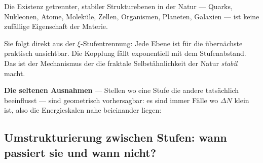 \begin{foundation}
Die Existenz getrennter, stabiler Strukturebenen
in der Natur --- Quarks, Nukleonen, Atome,
Moleküle, Zellen, Organismen, Planeten, Galaxien ---
ist keine zufällige Eigenschaft der Materie.

Sie folgt direkt aus der $\xi$-Stufentrennung:
Jede Ebene ist für die übernächste praktisch unsichtbar.
Die Kopplung fällt exponentiell mit dem Stufenabstand.
Das ist der Mechanismus der die fraktale
Selbstähnlichkeit der Natur \emph{stabil} macht.

\textbf{Die seltenen Ausnahmen} --- Stellen wo eine Stufe
die andere tatsächlich beeinflusst ---
sind geometrisch vorhersagbar:
es sind immer Fälle wo $\Delta N$ klein ist,
also die Energieskalen nahe beieinander liegen:

\begin{center}
\end{center}
\end{foundation}

\subsection{Umstrukturierung zwischen Stufen:
  wann passiert sie und wann nicht?}

